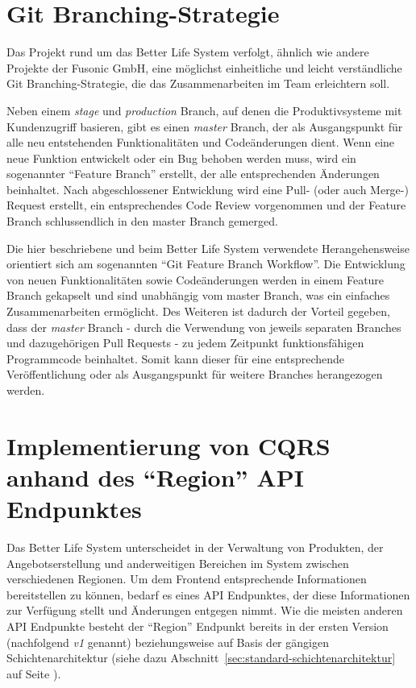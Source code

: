 \documentclass[a4paper,12pt,twoside]{scrreprt}
\begin{document}
\section{Git Branching-Strategie}
\label{sec:git-branching-strategie}
Das Projekt rund um das Better Life System verfolgt, ähnlich wie andere Projekte der Fusonic GmbH, eine möglichst einheitliche und leicht verständliche Git Branching-Strategie, die das Zusammenarbeiten im Team erleichtern soll.

\medskip

Neben einem \textit{stage} und \textit{production} Branch, auf denen die Produktivsysteme mit Kundenzugriff basieren, gibt es einen \textit{master} Branch, der als Ausgangspunkt für alle neu entstehenden Funktionalitäten und Codeänderungen dient. Wenn eine neue Funktion entwickelt oder ein Bug behoben werden muss, wird ein sogenannter \enquote{Feature Branch} erstellt, der alle entsprechenden Änderungen beinhaltet. Nach abgeschlossener Entwicklung wird eine Pull- (oder auch Merge-) Request erstellt, ein entsprechendes Code Review vorgenommen und der Feature Branch schlussendlich in den master Branch gemerged.

\medskip

Die hier beschriebene und beim Better Life System verwendete Herangehensweise orientiert sich am sogenannten \enquote{Git Feature Branch Workflow}. Die Entwicklung von neuen Funktionalitäten sowie Codeänderungen werden in einem Feature Branch gekapselt und sind unabhängig vom master Branch, was ein einfaches Zusammenarbeiten ermöglicht. Des Weiteren ist dadurch der Vorteil gegeben, dass der \textit{master} Branch - durch die Verwendung von jeweils separaten Branches und dazugehörigen Pull Requests - zu jedem Zeitpunkt funktionsfähigen Programmcode beinhaltet. Somit kann dieser für eine entsprechende Veröffentlichung oder als Ausgangspunkt für weitere Branches herangezogen werden. \parencite[]{atlassian_git_2020}

\clearpage

\section{Implementierung von CQRS anhand des \enquote{Region} API Endpunktes}
\label{sec:cqrs-implementierung-region}
Das Better Life System unterscheidet in der Verwaltung von Produkten, der Angebotserstellung und anderweitigen Bereichen im System zwischen verschiedenen Regionen. Um dem Frontend entsprechende Informationen bereitstellen zu können, bedarf es eines API Endpunktes, der diese Informationen zur Verfügung stellt und Änderungen entgegen nimmt. Wie die meisten anderen API Endpunkte besteht der \enquote{Region} Endpunkt bereits in der ersten Version (nachfolgend \textit{v1} genannt) beziehungsweise auf Basis der gängigen Schichtenarchitektur (siehe dazu Abschnitt~\ref{sec:standard-schichtenarchitektur} auf Seite \pageref{sec:standard-schichtenarchitektur}).
\end{document}
